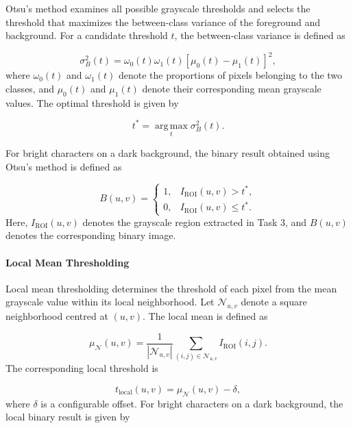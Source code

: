 \documentclass[conference]{IEEEtran}
\begin{document}
Otsu's method examines all possible grayscale thresholds and selects
the threshold that maximizes the between-class variance of the
foreground and background. For a candidate threshold $t$, the
between-class variance is defined as

\begin{equation}
\sigma_B^2(t)
=
\omega_0(t)\omega_1(t)
\left[\mu_0(t)-\mu_1(t)\right]^2,
\label{eq:between_class_variance}
\end{equation}
where $\omega_0(t)$ and $\omega_1(t)$ denote the proportions of pixels
belonging to the two classes, and $\mu_0(t)$ and $\mu_1(t)$ denote
their corresponding mean grayscale values. The optimal threshold is
given by

\begin{equation}
t^*
=
\operatorname*{arg\,max}_{t}
\sigma_B^2(t).
\label{eq:otsu_threshold}
\end{equation}

For bright characters on a dark background, the binary result obtained
using Otsu's method is defined as

\begin{equation}
B(u,v)
=
\begin{cases}
1, & I_{\mathrm{ROI}}(u,v)>t^*,\\[4pt]
0, & I_{\mathrm{ROI}}(u,v)\leq t^*.
\end{cases}
\label{eq:otsu_binarization}
\end{equation}
Here, $I_{\mathrm{ROI}}(u,v)$ denotes the grayscale region extracted in
Task 3, and $B(u,v)$ denotes the corresponding binary image.

\paragraph{Local Mean Thresholding}

Local mean thresholding determines the threshold of each pixel from
the mean grayscale value within its local neighborhood. Let
$\mathcal{N}_{u,v}$ denote a square neighborhood centred at $(u,v)$.
The local mean is defined as

\begin{equation}
\mu_{\mathcal{N}}(u,v)
=
\frac{1}{|\mathcal{N}_{u,v}|}
\sum_{(i,j)\in\mathcal{N}_{u,v}}
I_{\mathrm{ROI}}(i,j).
\label{eq:local_mean}
\end{equation}
The corresponding local threshold is

\begin{equation}
t_{\mathrm{local}}(u,v)
=
\mu_{\mathcal{N}}(u,v)-\delta,
\label{eq:local_threshold}
\end{equation}
where $\delta$ is a configurable offset. For bright characters on a
dark background, the local binary result is given by
\end{document}
